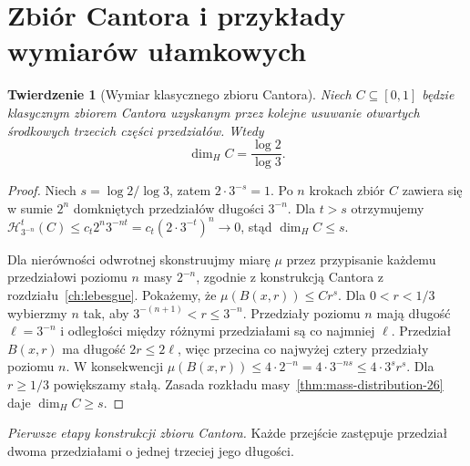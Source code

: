\documentclass[11pt,a4paper,oneside]{book}
\numberwithin{equation}{chapter}
\theoremstyle{plain}
\newtheorem{twierdzenie}{Twierdzenie}[chapter]
\theoremstyle{definition}
\theoremstyle{remark}
\begin{document}
\section{Zbiór Cantora i przykłady wymiarów ułamkowych}
\begin{twierdzenie}[Wymiar klasycznego zbioru Cantora]
\label{thm:cantor-dimension-26}
Niech $C\subseteq[0,1]$ będzie klasycznym zbiorem
Cantora uzyskanym przez kolejne usuwanie otwartych
środkowych trzecich części przedziałów. Wtedy
\[
 \dim_HC=\frac{\log2}{\log3}.
\]
\end{twierdzenie}
\begin{proof}
Niech $s=\log2/\log3$, zatem $2\cdot3^{-s}=1$.
Po $n$ krokach zbiór $C$ zawiera się w sumie
$2^n$ domkniętych przedziałów długości $3^{-n}$.
Dla $t>s$ otrzymujemy
$\mathcal H^t_{3^{-n}}(C)\le
c_t2^n3^{-nt}=c_t(2\cdot3^{-t})^n\to0$,
stąd $\dim_HC\le s$.

Dla nierówności odwrotnej skonstruujmy miarę
$\mu$ przez przypisanie każdemu przedziałowi
poziomu $n$ masy $2^{-n}$, zgodnie z konstrukcją
Cantora z rozdziału~\ref{ch:lebesgue}.
Pokażemy, że $\mu(B(x,r))\le Cr^s$.
Dla $0<r<1/3$ wybierzmy $n$ tak, aby
$3^{-(n+1)}<r\le3^{-n}$. Przedziały poziomu $n$
mają długość $\ell=3^{-n}$ i odległości między
różnymi przedziałami są co najmniej $\ell$.
Przedział $B(x,r)$ ma długość $2r\le2\ell$,
więc przecina co najwyżej cztery przedziały poziomu
$n$. W konsekwencji
$\mu(B(x,r))\le4\cdot2^{-n}
=4\cdot3^{-ns}\le4\cdot3^sr^s$.
Dla $r\ge1/3$ powiększamy stałą.
Zasada rozkładu masy~\ref{thm:mass-distribution-26}
daje $\dim_HC\ge s$.
\end{proof}

\begin{center}
\end{center}
\noindent\textit{Pierwsze etapy konstrukcji zbioru Cantora.}
Każde przejście zastępuje przedział dwoma
przedziałami o jednej trzeciej jego długości.
\end{document}
